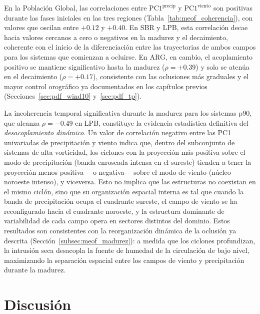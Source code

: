 

En la Población Global, las correlaciones entre $\text{PC1}^{\text{precip}}$ y $\text{PC1}^{\text{viento}}$ son positivas durante las fases iniciales en las tres regiones (Tabla~\ref{tab:meof_coherencia}), con valores que oscilan entre $+0.12$ y $+0.40$. En SBR y LPB, esta correlación decae hacia valores cercanos a cero o negativos en la madurez y el decaimiento, coherente con el inicio de la diferenciación entre las trayectorias de ambos campos para los sistemas que comienzan a ocluirse. En ARG, en cambio, el acoplamiento positivo se mantiene significativo hasta la madurez ($\rho = +0.39$) y solo se atenúa en el decaimiento ($\rho = +0.17$), consistente con las oclusiones más graduales y el mayor control orográfico ya documentados en los capítulos previos (Secciones~\ref{sec:pdf_wind10} y~\ref{sec:pdf_tp}).

La incoherencia temporal significativa durante la madurez para los sistemas p90, que alcanza $\rho = -0.49$ en LPB, constituye la evidencia estadística definitiva del \textit{desacoplamiento dinámico}. Un valor de correlación negativo entre las PC1 univariadas de precipitación y viento indica que, dentro del subconjunto de sistemas de alta vorticidad, los ciclones con la proyección más positiva sobre el modo de precipitación (banda enroscada intensa en el sureste) tienden a tener la proyección menos positiva ---o negativa--- sobre el modo de viento (núcleo noroeste intenso), y viceversa. Esto no implica que las estructuras no coexistan en el mismo ciclón, sino que su organización espacial interna es tal que cuando la banda de precipitación ocupa el cuadrante sureste, el campo de viento se ha reconfigurado hacia el cuadrante noroeste, y la estructura dominante de variabilidad de cada campo opera en sectores distintos del dominio. Estos resultados son consistentes con la reorganización dinámica de la oclusión ya descrita (Sección~\ref{subsec:meof_madurez}): a medida que los ciclones profundizan, la intrusión seca desacopla la fuente de humedad de la circulación de bajo nivel, maximizando la separación espacial entre los campos de viento y precipitación durante la madurez.

\section{Discusión}
\label{sec:discusion_meof}

